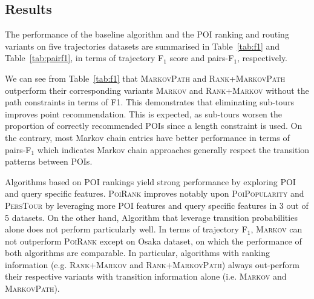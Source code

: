\subsection{Results}
\label{sec:result}
\secmoveup
%
%
%
%
%
%




The performance of the baseline algorithm and the POI ranking and routing variants
on five trajectories datasets are summarised in Table~\ref{tab:f1}
and Table~\ref{tab:pairf1}, in terms of trajectory F$_1$ score and pairs-F$_1$, respectively.


We can see from Table~\ref{tab:f1} that \textsc{MarkovPath} and \textsc{Rank+MarkovPath}
outperform their corresponding variants \textsc{Markov} and \textsc{Rank+Markov} without the path constraints in terms of F1.
This demonstrates that eliminating sub-tours improves point recommendation.
This is expected, as sub-tours worsen the proportion of correctly
recommended POIs since a length constraint is used.
On the contrary, most Markov chain entries have better performance in terms of pairs-F$_1$
which indicates Markov chain approaches generally
respect the transition patterns between POIs.
%


Algorithms based on POI rankings yield strong performance
by exploring POI and query specific features.
%
\textsc{PoiRank} improves notably upon \textsc{PoiPopularity} and \textsc{PersTour}
 by leveraging more POI features and query specific features in 3 out of 5 datasets.
On the other hand, Algorithm that leverage transition probabilities alone does not perform particularly well.
%
In terms of trajectory F$_1$,
\textsc{Markov} can not outperform \textsc{PoiRank} except on Osaka dataset,
on which the performance of both algorithms are comparable.
In particular, algorithms with ranking information (e.g. \textsc{Rank+Markov} and \textsc{Rank+MarkovPath}) 
always out-perform their respective variants with transition information alone (i.e. \textsc{Markov} and \textsc{MarkovPath}).

